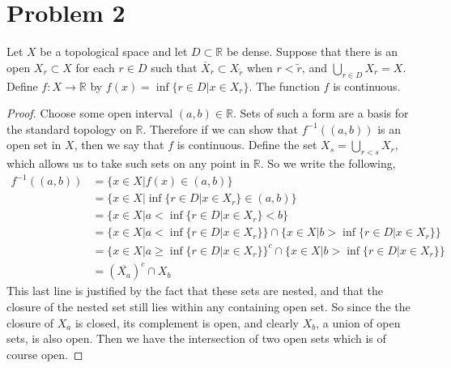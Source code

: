\documentclass{article}
\theoremstyle{definition}
\begin{document}
\section*{Problem 2}
    \begin{mdframed}
        Let $X$ be a topological space and let $D \subset \mathbb{R}$ be dense. Suppose that there
        is an open $X_r \subset X$ for each $r \in D$ such that $\overline{X}_r \subset X_{\tilde{r}}$
        when $r < \tilde{r}$, and $\bigcup_{r \in D}X_r = X$. Define $f: X \rightarrow \mathbb{R}$
        by $f(x) = \inf\{r \in D | x \in X_r\}$. The function $f$ is continuous.
    \end{mdframed}
    \begin{proof}
        Choose some open interval $(a,b) \in \mathbb{R}$. Sets of such a form are a basis for the
        standard topology on $\mathbb{R}$. Therefore if we can show that $f^{-1}((a,b))$ is an open
        set in $X$, then we say that $f$ is continuous. Define the set $X_s = \bigcup_{r < s}X_r$,
        which allows us to take such sets on any point in $\mathbb{R}$.
        So we write the following,
        \begin{align}
            f^{-1}((a,b)) &= \{x \in X | f(x) \in (a,b) \} \\
            &=\{x \in X | \inf\{r \in D | x \in X_r\} \in (a,b)\}\\
            &=\{x \in X | a < \inf\{r \in D | x \in X_r\} < b\}\\
            &=\{x \in X | a < \inf\{r \in D | x \in X_r\}\} \cap \{x \in X | b > \inf\{r \in D | x \in X_r\}\}\\
            &=\{x \in X | a \geqslant \inf\{r \in D | x \in X_r\}\}^c \cap \{x \in X | b > \inf\{r \in D | x \in X_r\}\}\\
            &= \left(\overline{X_a}\right)^c \cap X_b 
        \end{align}
        This last line is justified by the fact that these sets are nested, and that the closure of the 
        nested set still lies within any containing open set. So since the the closure of $X_a$ is
        closed, its complement is open, and clearly $X_b$, a union of open sets, is also open.
        Then we have the intersection of two open sets which is of course open.
    \end{proof}
\end{document}
